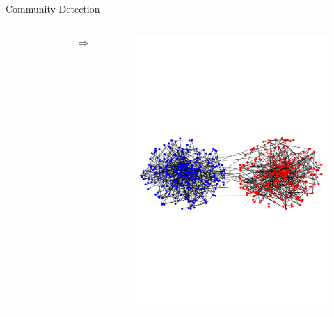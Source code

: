 \documentclass[notheorems]{beamer}
\begin{document}
\begin{frame}{Community Detection}
\begin{columns}
\begin{figure}
		\end{figure}
		$\Rightarrow$
		\begin{figure}
		\includegraphics[width=\textwidth]{bennot.pdf}
		\end{figure}
	\end{columns}
\end{frame}
\end{document}
